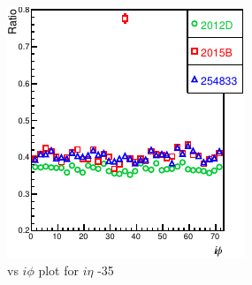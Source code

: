 \begin{figure}[h!]
\centering
\includegraphics[width=0.5\linewidth]{../Figures/Chap2/ImageFiles_HF/2012vs2015/Rvsiphi1.pdf}
\caption{\ratiosl vs $i \phi$ plot for $i \eta$ -35}
\label{fig:Rvsiphi1}
\end{figure}



